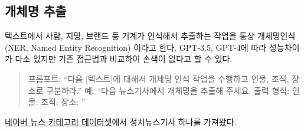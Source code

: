 \documentclass[
  letterpaper,
]{book}
\begin{document}
\hypertarget{uxac1cuxccb4uxba85-uxcd94uxcd9c}{%
\subsection{개체명 추출}\label{uxac1cuxccb4uxba85-uxcd94uxcd9c}}

텍스트에서 사람, 지명, 브랜드 등 기계가 인식해서 추출하는 작업을 통상
개체명인식(NER, Named Entity Recognition) 이라고 한다. GPT-3.5, GPT-4에
따라 성능차이가 다소 있지만 기존 접근법과 비교하여 손색이 없다고 할 수
있다.

\begin{quote}
프롬프트: ``다음 {[}텍스트{]}에 대해서 개체명 인식 작업을 수행하고 인물,
조직, 장소로 구분하라.'' 예: ``다음 뉴스기사에서 개체명을 추출해 주세요.
출력 형식: 인물: 조직: 장소: ''
\end{quote}

\href{https://drive.google.com/drive/folders/1EHYsVtcgpcacM2Ta33pTLYfp6CznaUX3?usp=sharing}{네이버
뉴스 카테고리 데이터셋}에서 정치뉴스기사 하나를 가져왔다.
\end{document}
